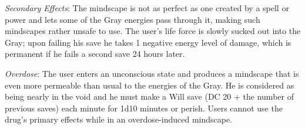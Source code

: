 \textit{Secondary Effects}: The mindscape is not as perfect as one created by a spell or power and lets some of the Gray energies pass through it, making such mindscapes rather unsafe to use. The user's life force is slowly sucked out into the Gray; upon failing his save he takes 1 negative energy level of damage, which is permanent if he fails a second save 24 hours later.

\textit{Overdose}: The user enters an unconscious state and produces a mindscape that is even more permeable than usual to the energies of the Gray. He is considered as being nearly in the void and he must make a Will save (DC 20 + the number of previous saves) each minute for 1d10 minutes or perish. Users cannot use the drug's primary effects while in an overdose-induced mindscape.